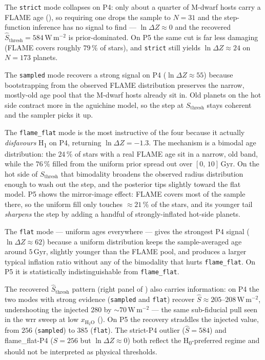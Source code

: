 The \texttt{strict} mode collapses on P4: only about a quarter of
M-dwarf hosts carry a FLAME age (), so
requiring one drops the sample to $N=31$ and the step-function
inference has no signal to find --- $\ln\Delta Z\approx 0$ and the
recovered $\hat{S}_\mathrm{thresh}=584\,\mathrm{W\,m^{-2}}$ is
prior-dominated.  On P5 the same cut is far less damaging (FLAME
covers roughly $79\,\%$ of stars), and \texttt{strict} still yields
$\ln\Delta Z\approx 24$ on $N=173$ planets.

The \texttt{sampled} mode recovers a strong signal on P4
($\ln\Delta Z\approx 55$) because bootstrapping from the observed
FLAME distribution preserves the narrow, mostly-old age pool that
the M-dwarf hosts already sit in.  Old planets on the hot side
contract more in the aguichine model, so the step at
$S_\mathrm{thresh}$ stays coherent and the sampler picks it up.

The \texttt{flame\_flat} mode is the most instructive of the four
because it actually \emph{disfavours} H\textsubscript{1} on P4,
returning $\ln\Delta Z = -1.3$.  The mechanism is a bimodal age
distribution: the $24\,\%$ of stars with a real FLAME age sit in a
narrow, old band, while the $76\,\%$ filled from the uniform prior
spread out over $[0,\,10]\,\mathrm{Gyr}$.  On the hot side of
$S_\mathrm{thresh}$ that bimodality broadens the observed radius
distribution enough to wash out the step, and the posterior tips
slightly toward the flat model.  P5 shows the mirror-image effect:
FLAME covers most of the sample there, so the uniform fill only
touches $\approx 21\,\%$ of the stars, and its younger tail
\emph{sharpens} the step by adding a handful of strongly-inflated
hot-side planets.

The \texttt{flat} mode --- uniform ages everywhere --- gives the
strongest P4 signal ($\ln\Delta Z\approx 62$) because a uniform
distribution keeps the sample-averaged age around $5\,\mathrm{Gyr}$,
slightly younger than the FLAME pool, and produces a larger typical
inflation ratio without any of the bimodality that hurts
\texttt{flame\_flat}.  On P5 it is statistically indistinguishable
from \texttt{flame\_flat}.

The recovered $\hat{S}_\mathrm{thresh}$ pattern (right panel of
) also carries information: on P4
the two modes with strong evidence (\texttt{sampled} and \texttt{flat})
recover $\hat{S}\approx 205$--$208\,\mathrm{W\,m^{-2}}$, undershooting
the injected $280$ by ${\sim}70\,\mathrm{W\,m^{-2}}$ --- the same
sub-fiducial pull seen in the wrr sweep at low $x_{\mathrm{H_2O}}$
().  On P5 the recovery straddles the injected
value, from $256$ (\texttt{sampled}) to $385$ (\texttt{flat}).  The
strict-P4 outlier ($\hat{S}=584$) and flame\_flat-P4
($\hat{S}=256$ but $\ln\Delta Z\approx 0$) both reflect the H\textsubscript{0}-preferred
regime and should not be interpreted as physical thresholds.

